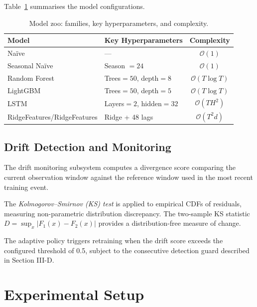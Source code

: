 \documentclass[conference]{IEEEtran}
\begin{document}
Table~\ref{tab:models} summarises the model configurations.

\begin{table}[t]
	\centering
	\caption{Model zoo: families, key hyperparameters, and complexity.}
	\label{tab:models}
	\begin{tabular}{llc}
		\toprule
		Model                       & Key Hyperparameters     & Complexity              \\
		\midrule
		Na\"{i}ve                   & ---                     & $\mathcal{O}(1)$        \\
		Seasonal Na\"{i}ve          & Season $= 24$           & $\mathcal{O}(1)$        \\
		Random Forest               & Trees$=50$, depth$=8$   & $\mathcal{O}(T \log T)$ \\
		LightGBM                    & Trees$=50$, depth$=5$   & $\mathcal{O}(T \log T)$ \\
		LSTM                        & Layers$=2$, hidden$=32$ & $\mathcal{O}(T H^2)$    \\
		RidgeFeatures/RidgeFeatures & Ridge + 48 lags         & $\mathcal{O}(T^2 d)$    \\
		\bottomrule
	\end{tabular}
\end{table}

\subsection{Drift Detection and Monitoring}

The drift monitoring subsystem computes a divergence score comparing
the current observation window against the reference window used in
the most recent training event.

The \textit{Kolmogorov--Smirnov (KS) test} is applied to empirical
CDFs of residuals, measuring non-parametric distribution discrepancy.
The two-sample KS statistic $D = \sup_x |F_1(x) - F_2(x)|$ provides a
distribution-free measure of change.

The adaptive policy triggers retraining when the drift score exceeds
the configured threshold of 0.5, subject to the consecutive detection
guard described in Section III-D.

\section{Experimental Setup}
\end{document}
